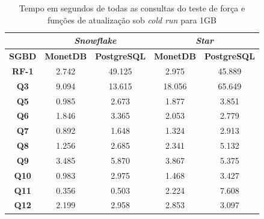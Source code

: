 \begin{table}[htpb]
        \centering
        \caption{Tempo em segundos de todas as consultas do teste de força e funções de atualização sob \textit{cold run} para 1GB}
        \label{tab:queries_cold_1}
        \begin{tabular}{|c|c|c|c|c|} 
        \cline{2-5}
        \multicolumn{1}{c|}{} & \multicolumn{2}{c|}{\textit{\textbf{Snowflake}} } & \multicolumn{2}{c|}{\textit{\textbf{Star}} }  \\ 
        \hline
         \textbf{SGBD}        & \textbf{MonetDB}  & \textbf{PostgreSQL}           & \textbf{MonetDB}  & \textbf{PostgreSQL}       \\ 
        \hline
         \textbf{RF-1}        & 2.742             & 49.125                        & 2.975             & 45.889                    \\ 
        \hline
         \textbf{Q3}          & 9.094             & 13.615                        & 18.056            & 65.649                    \\ 
        \hline
         \textbf{Q5}          & 0.985             & 2.673                         & 1.877             & 3.851                     \\ 
        \hline
         \textbf{Q6}          & 1.846             & 3.365                         & 2.053             & 2.779                     \\ 
        \hline
         \textbf{Q7}          & 0.892             & 1.648                         & 1.324             & 2.913                     \\ 
        \hline
         \textbf{Q8}          & 1.256             & 2.685                         & 2.341             & 5.132                     \\ 
        \hline
         \textbf{Q9}          & 3.485             & 5.870                         & 3.867             & 5.375                     \\ 
        \hline
         \textbf{Q10}         & 0.983             & 2.975                         & 1.468             & 3.427                     \\ 
        \hline
         \textbf{Q11}         & 0.356             & 0.503                         & 2.224             & 7.608                     \\ 
        \hline
         \textbf{Q12}         & 2.199             & 2.958                         & 2.853             & 3.097                     \\ 

\end{tabular}
\end{table}
